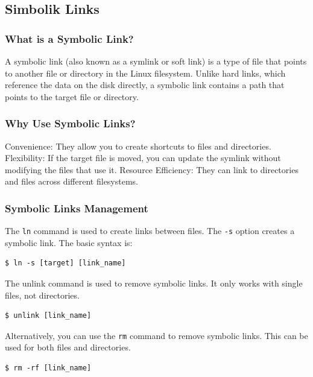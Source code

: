 \documentclass{article}
\newenvironment{blocktemplateI}[1]{%
    \tcolorbox[beamer,%
    noparskip,breakable,
    colframe=Violet,%
    colbacklower=Black,%
    title=#1]}%
    {\endtcolorbox}
\newenvironment{codetemplate}[1][]{%
  \mybasecolorbox[#1]
  \itshape
}{%
  \endmybasecolorbox
}
\begin{document}
\subsection{Simbolik Links}
\subsubsection{What is a Symbolic Link?}
A symbolic link (also known as a symlink or soft link) is a type of file that points to another file or directory in the Linux filesystem. Unlike hard links, which reference the data on the disk directly, a symbolic link contains a path that points to the target file or directory.

\subsubsection{Why Use Symbolic Links?}
Convenience: They allow you to create shortcuts to files and directories.
Flexibility: If the target file is moved, you can update the symlink without modifying the files that use it.
Resource Efficiency: They can link to directories and files across different filesystems.

\subsubsection{Symbolic Links Management}
The \verb|ln| command is used to create links between files. The \verb|-s| option creates a symbolic link. The basic syntax is:
\begin{codetemplate}{}
\begin{verbatim}
$ ln -s [target] [link_name]
\end{verbatim}
\end{codetemplate}

The unlink command is used to remove symbolic links. It only works with single files, not directories.
\begin{codetemplate}{}
\begin{verbatim}
$ unlink [link_name]
\end{verbatim}
\end{codetemplate}

\begin{blocktemplateI}{Note}
Alternatively, you can use the \verb|rm| command to remove symbolic links. This can be used for both files and directories.
\begin{codetemplate}{}
\begin{verbatim}
$ rm -rf [link_name]
\end{verbatim}
\end{codetemplate}
\end{blocktemplateI}
\end{document}
